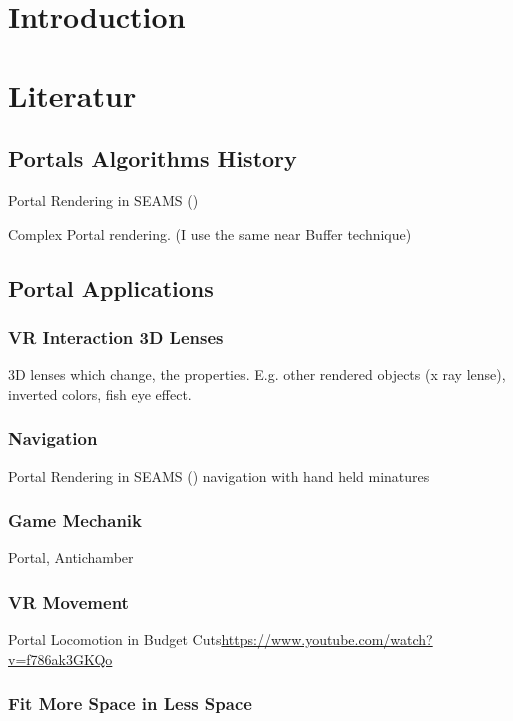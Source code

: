 \section{Introduction}

\section{Literatur}

\subsection{Portals Algorithms History}


Portal Rendering in SEAMS (\cite{schmalstieg:1999:sewing})

Complex Portal rendering. (I use the same near Buffer technique) \cite{ lowe:2005:technique}

\subsection{Portal Applications}


\subsubsection{VR Interaction 3D Lenses}
\cite{borst:2009:real}
3D lenses which change, the properties. E.g. other rendered objects (x ray lense), inverted colors, fish eye effect.

\subsubsection{Navigation}
Portal Rendering in SEAMS (\cite{schmalstieg:1999:sewing})
\cite{pausch:1995:navigation} navigation with hand held minatures


\subsubsection{Game Mechanik}
Portal, Antichamber

\subsubsection{VR Movement}

Portal Locomotion in Budget Cuts\url{https://www.youtube.com/watch?v=f786ak3GKQo}

\subsubsection{Fit More Space in Less Space}


